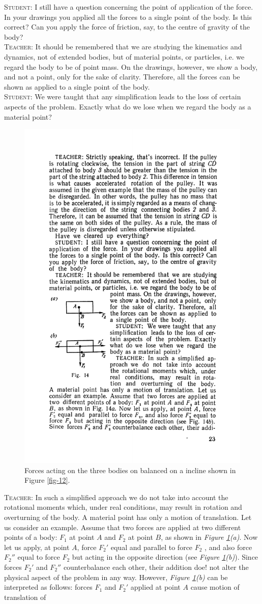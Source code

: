 \documentclass[a4paper,sfsidenotes]{tufte-book}
\begin{document}
\textsc{Student:} I still have a question concerning the point of application of the force. In your drawings you applied all the forces to a single point of the body. Is this correct? Can you apply the force of friction, say, to the centre of gravity of the body?
\\
\textsc{Teacher:} It should be remembered that we are studying the kinematics and dynamics, not of extended bodies, but of material points, or particles, i.e. we regard the body to be of point mass. On the drawings, however, we show a body, and not a point, only for the sake of clarity. Therefore, all the forces can be shown as applied to a single point of the body.
\\
\textsc{Student:} We were taught that any simplification leads to the loss of certain aspects of the problem. Exactly what do we lose when we regard the body as a material point?
\\
\begin{figure}
\centering
\includegraphics[width=0.4\linewidth]{fig-014a.pdf}
\caption{Forces acting on the three bodies on balanced on a incline shown in Figure \ref{fig-12}.}
\label{fig-14}
\end{figure}
\textsc{Teacher:} In such a simplified approach we do not take into account the rotational moments which, under real conditions, may result in rotation and overturning of the body. A material point has only a motion of translation. Let us consider an example. Assume that two forces are applied at two different points of a body: $F_{1}$ at point $A$ and $F_{2}$ at point $B$, as shown in \emph{Figure \ref{fig-14}(a)}. Now let us apply, at point $A$, force $F_{2}'$  equal and parallel to force $F_{2}$  , and also force $F_{2}''$  equal to force $F_{2}$  but acting in the opposite direction (see \emph{Figure \ref{fig-14}(b)}). Since forces $F_{2}'$ and $F_{2}''$ counterbalance each other, their addition doe! not alter the physical aspect of the problem in any way. However, \emph{Figure \ref{fig-14}(b)} can be interpreted as follows: forces $F_{1}$ and  $F_{2}'$ applied at point $A$ cause motion of translation of
\end{document}
